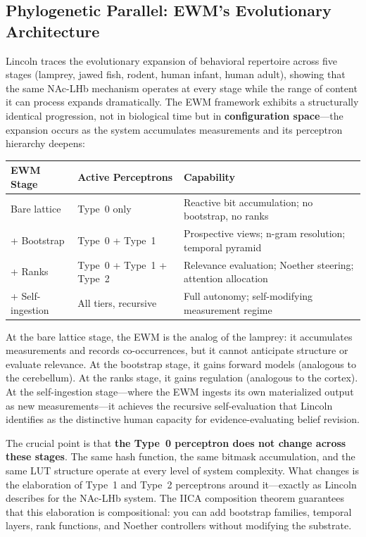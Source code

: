 \documentclass[11pt,a4paper]{article}
\theoremstyle{remark}
\begin{document}
\subsection{Phylogenetic Parallel: EWM's Evolutionary Architecture}
\label{sec:phylogenetic}

Lincoln traces the evolutionary expansion of behavioral repertoire across five
stages (lamprey, jawed fish, rodent, human infant, human adult), showing that
the same NAc-LHb mechanism operates at every stage while the range of content it
can process expands dramatically. The EWM framework exhibits a structurally
identical progression, not in biological time but in \textbf{configuration
space}---the expansion occurs as the system accumulates measurements and its
perceptron hierarchy deepens:

\begin{center}
\begin{tabular}{@{}lll@{}}
\toprule
\textbf{EWM Stage} & \textbf{Active Perceptrons} & \textbf{Capability} \\
\midrule
Bare lattice    & Type~0 only &
  Reactive bit accumulation; no bootstrap, no ranks \\
+ Bootstrap     & Type~0 + Type~1 &
  Prospective views; n-gram resolution; temporal pyramid \\
+ Ranks         & Type~0 + Type~1 + Type~2 &
  Relevance evaluation; Noether steering; attention allocation \\
+ Self-ingestion & All tiers, recursive &
  Full autonomy; self-modifying measurement regime \\
\bottomrule
\end{tabular}
\end{center}

At the bare lattice stage, the EWM is the analog of the lamprey: it accumulates
measurements and records co-occurrences, but it cannot anticipate structure or
evaluate relevance. At the bootstrap stage, it gains forward models (analogous
to the cerebellum). At the ranks stage, it gains regulation (analogous to the
cortex). At the self-ingestion stage---where the EWM ingests its own
materialized output as new measurements---it achieves the recursive
self-evaluation that Lincoln identifies as the distinctive human capacity for
evidence-evaluating belief revision.

The crucial point is that \textbf{the Type~0 perceptron does not change across
these stages}. The same hash function, the same bitmask accumulation, and the
same LUT structure operate at every level of system complexity. What changes is
the elaboration of Type~1 and Type~2 perceptrons around it---exactly as Lincoln
describes for the NAc-LHb system. The IICA composition theorem guarantees that
this elaboration is compositional: you can add bootstrap families, temporal
layers, rank functions, and Noether controllers without modifying the substrate.
\end{document}
